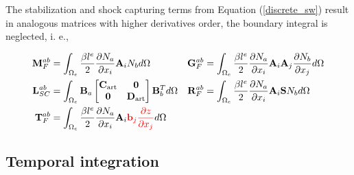 \documentclass[a4paper,12pt]{elsarticle}
\newcommand{\Miguel}[1]{\textcolor{red}{#1}}
\newcommand{\pder}[2]{\frac{\partial#1}{\partial#2}}
\begin{document}
The stabilization and shock capturing terms from Equation (\ref{discrete_sw}) result in analogous matrices with higher derivatives order, the boundary integral is neglected, i. e.,

\begin{align}
\displaystyle\mathbf{M}_F^{ab} &= \int_{\Omega_e} \frac{\beta l^e}{2} \pder{N_a}{x_i}\mathbf{A}_i N_b d\Omega &
\displaystyle\mathbf{G}_F^{ab} &= \int_{\Omega_e} \frac{\beta l^e}{2} \pder{N_a}{x_i}\mathbf{A}_i\mathbf{A}_j \pder{N_b}{x_j} d\Omega \nonumber\\
\displaystyle\mathbf{L}_{SC}^{ab} &= \int_{\Omega_e} \mathbf{B}_a \left[\begin{matrix}
        \mathbf{C}_\text{art} & \mathbf{0} \\ \mathbf{0} & \mathbf{D}_\text{art}
    \end{matrix}\right] \mathbf{B}_b^T d\Omega &
\displaystyle\mathbf{R}_F^{ab} &= \int_{\Omega_e} \frac{\beta l^e}{2} \pder{N_a}{x_i}\mathbf{A}_i \mathbf{S} N_b d\Omega \\
\displaystyle\mathbf{T}_F^{ab} &= \int_{\Omega_e} \frac{\beta l^e}{2} \pder{N_a}{x_i}\mathbf{A}_i \Miguel{\mathbf{b}_j \pder{z}{x_j}} d\Omega
\nonumber
\end{align}


\subsection{Temporal integration}
\end{document}
